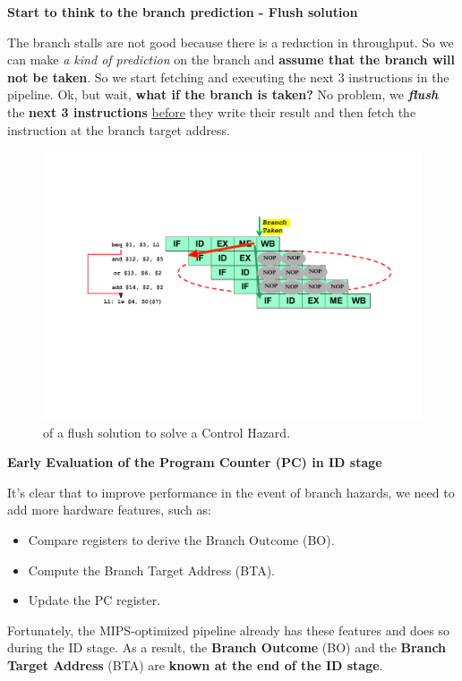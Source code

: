 \begin{flushleft}
    \textcolor{Green3}{\textbf{ Start to think to the branch prediction - Flush solution}}
\end{flushleft}
The branch stalls are not good because there is a reduction in throughput. So we can make \emph{a kind of prediction} on the branch and \textbf{assume that the branch will not be taken}. So we start fetching and executing the next 3 instructions in the pipeline. Ok, but wait, \textbf{what if the branch is taken?} No problem, we \textbf{\emph{flush}} the \textbf{next 3 instructions} \underline{before} they write their result and then fetch the instruction at the branch target address.
\begin{figure}[!htp]
    \centering
    \includegraphics[width=\textwidth]{img/banch-prediciton-control-hazard.pdf}
    \caption{ of a flush solution to solve a Control Hazard.}
\end{figure}

\newpage

\begin{flushleft}
    \textcolor{Green3}{\textbf{ Early Evaluation of the Program Counter (PC) in ID stage}}
\end{flushleft}
It's clear that to improve performance in the event of branch hazards, we need to add more hardware features, such as:
\begin{itemize}
    \item Compare registers to derive the Branch Outcome (BO).
    \item Compute the Branch Target Address (BTA).
    \item Update the PC register.
\end{itemize}
Fortunately, the MIPS-optimized pipeline already has these features and does so during the ID stage. As a result, the \textbf{Branch Outcome} (BO) and the \textbf{Branch Target Address} (BTA) are \textbf{known at the end of the ID stage}.

